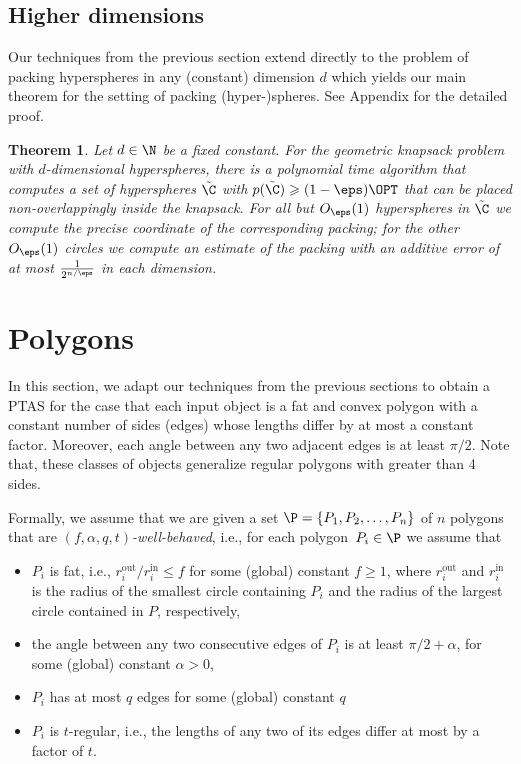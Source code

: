 \documentclass[10pt,a4paper]{article}
\newtheorem{theorem}{Theorem}[section]
\theoremstyle{plain}
\theoremstyle{plain}
\theoremstyle{plain}
\theoremstyle{definition}
\begin{document}
{\subsection{Higher dimensions}

Our techniques from the previous section extend directly to the problem of packing
hyperspheres in any (constant) dimension $d$ which yields our main theorem for the setting of packing
(hyper-)spheres. See Appendix for the detailed proof. 

\begin{theorem}\label{thm:d-dim-ptas} Let $d\in\N$ be a fixed constant. For the geometric knapsack problem with
	$d$-dimensional hyperspheres, there is a polynomial time algorithm
	that computes a set of hyperspheres $\tilde{\C}$ with $p(\tilde{\C})\geqslant(1-\eps)\OPT$
	that can be placed non-overlappingly inside the knapsack. For all
	but $O_{\eps}(1)$ hyperspheres in $\tilde{\C}$ we compute the
	precise coordinate of the corresponding packing; for the other $O_{\eps}(1)$
	circles we compute an estimate of the packing with an additive error
	of at most $\frac{1}{2^{n/\eps}}$ in each dimension. \end{theorem}


\section{Polygons}
\label{sec:polygon}

{
In this section, we adapt our techniques from the previous sections to obtain a \textsf{PTAS} for the case that each input object is a fat and convex
polygon with a constant number of sides (edges) whose lengths differ by at most a constant factor. Moreover,  
each angle between any two adjacent edges is at least $\pi/2$. Note that, these classes of objects generalize regular polygons with greater than 4 sides. 
}

{Formally, we assume that we are given a set
$\P = \{ P_1, P_2, \dots , P_n \}$ of $n$ polygons that are \emph{$(f,\alpha,q, t)$-well-behaved}, i.e., for each
polygon~$P_{i}\in\P$ we assume that}
\begin{itemize}
	\item $P_i$ is fat, i.e., $r_{i}^{\mathrm{out}}/r_{i}^{\mathrm{in}}\le f$
	for some (global) constant $f \ge 1$, where
	$r_{i}^{\mathrm{out}}$ and $r_{i}^{\mathrm{in}}$ is
	the radius of the smallest circle containing $P_{i}$ and the radius
	of the largest circle contained in $P$, respectively,
	\item the angle between any two consecutive edges of $P_i$ is at least $\pi/2+\alpha$,
	for some (global) constant $\alpha>0$,
	\item $P_i$ has at most $q$ {edges} for some (global) constant $q$
 \item $P_i$ is $t$-regular, i.e., the lengths of any two of its edges
	differ at most by a factor of $t$.
\end{itemize}

}
\end{document}
